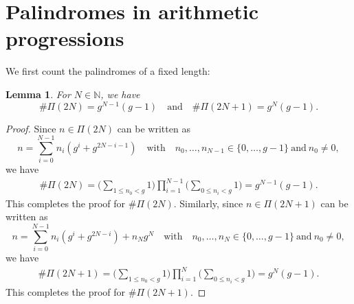 \documentclass{amsart}
\theoremstyle{plain}
\newtheorem{lemma}[theorem]{Lemma}
\theoremstyle{definition}
\renewcommand{\and}{\quad\text{and}\quad}
\begin{document}
\section{Palindromes in arithmetic progressions}
\label{sec:Palindrome_AP}
We first count the palindromes of a fixed length:
\begin{lemma}
\label{lem:Pi_count}
For $N\in\mathbb{N}$, we have
\[
\#\Pi(2N)
=
g^{N-1}(g-1)
\and
\#\Pi(2N+1)
=
g^{N}(g-1).
\]
\end{lemma}
\begin{proof}
Since $n\in\Pi(2N)$ can be written as
\[
n
=
\sum_{i=0}^{N-1}
n_{i}(g^{i}+g^{2N-i-1})
\quad\text{with}\quad
n_{0},\ldots,n_{N-1}\in\{0,\ldots,g-1\}
\ \text{and}\ 
n_{0}\neq0,
\]
we have
\begin{align}
\#\Pi(2N)
=
\biggl(\sum_{1\le n_{0}<g}1\biggr)
\prod_{i=1}^{N-1}
\biggl(\sum_{0\le n_{i}<g}1\biggr)
=
g^{N-1}(g-1).
\end{align}
This completes the proof for $\#\Pi(2N)$.
Similarly, since $n\in\Pi(2N+1)$ can be written as
\[
n
=
\sum_{i=0}^{N-1}
n_{i}(g^{i}+g^{2N-i})
+
n_{N}g^{N}
\quad\text{with}\quad
n_{0},\ldots,n_{N}\in\{0,\ldots,g-1\}
\ \text{and}\ 
n_{0}\neq0,
\]
we have
\begin{align}
\#\Pi(2N+1)
=
\biggl(\sum_{1\le n_{0}<g}1\biggr)
\prod_{i=1}^{N}
\biggl(\sum_{0\le n_{i}<g}1\biggr)
=
g^{N}(g-1).
\end{align}
This completes the proof for $\#\Pi(2N+1)$.
\end{proof}
\end{document}
